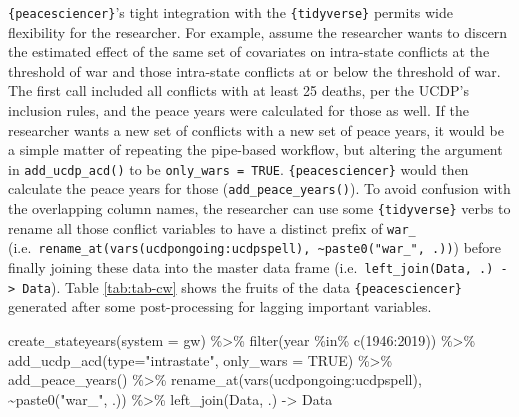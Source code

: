 \documentclass[
  11pt,
]{article}
\newenvironment{Shaded}{\begin{snugshade}}{\end{snugshade}}
\newcommand{\AttributeTok}[1]{\textcolor[rgb]{0.77,0.63,0.00}{#1}}
\newcommand{\ConstantTok}[1]{\textcolor[rgb]{0.00,0.00,0.00}{#1}}
\newcommand{\DecValTok}[1]{\textcolor[rgb]{0.00,0.00,0.81}{#1}}
\newcommand{\FunctionTok}[1]{\textcolor[rgb]{0.00,0.00,0.00}{#1}}
\newcommand{\NormalTok}[1]{#1}
\newcommand{\OtherTok}[1]{\textcolor[rgb]{0.56,0.35,0.01}{#1}}
\newcommand{\SpecialCharTok}[1]{\textcolor[rgb]{0.00,0.00,0.00}{#1}}
\newcommand{\StringTok}[1]{\textcolor[rgb]{0.31,0.60,0.02}{#1}}
\begin{document}
\texttt{\{peacesciencer\}}'s tight integration with the \texttt{\{tidyverse\}} permits wide flexibility for the researcher. For example, assume the researcher wants to discern the estimated effect of the same set of covariates on intra-state conflicts at the threshold of war and those intra-state conflicts at or below the threshold of war. The first call included all conflicts with at least 25 deaths, per the UCDP's inclusion rules, and the peace years were calculated for those as well. If the researcher wants a new set of conflicts with a new set of peace years, it would be a simple matter of repeating the pipe-based workflow, but altering the argument in \texttt{add\_ucdp\_acd()} to be \texttt{only\_wars\ =\ TRUE}. \texttt{\{peacesciencer\}} would then calculate the peace years for those (\texttt{add\_peace\_years()}). To avoid confusion with the overlapping column names, the researcher can use some \texttt{\{tidyverse\}} verbs to rename all those conflict variables to have a distinct prefix of \texttt{war\_} (i.e.~\texttt{rename\_at(vars(ucdpongoing:ucdpspell),\ \textasciitilde{}paste0("war\_",\ .))}) before finally joining these data into the master data frame (i.e.~\texttt{left\_join(Data,\ .)\ -\textgreater{}\ Data}). Table \ref{tab:tab-cw} shows the fruits of the data \texttt{\{peacesciencer\}} generated after some post-processing for lagging important variables.

\begin{Shaded}
\begin{Highlighting}[]
\FunctionTok{create\_stateyears}\NormalTok{(}\AttributeTok{system =} \StringTok{\textquotesingle{}gw\textquotesingle{}}\NormalTok{) }\SpecialCharTok{\%\textgreater{}\%}
  \FunctionTok{filter}\NormalTok{(year }\SpecialCharTok{\%in\%} \FunctionTok{c}\NormalTok{(}\DecValTok{1946}\SpecialCharTok{:}\DecValTok{2019}\NormalTok{)) }\SpecialCharTok{\%\textgreater{}\%}
  \FunctionTok{add\_ucdp\_acd}\NormalTok{(}\AttributeTok{type=}\StringTok{"intrastate"}\NormalTok{, }\AttributeTok{only\_wars =} \ConstantTok{TRUE}\NormalTok{) }\SpecialCharTok{\%\textgreater{}\%}
  \FunctionTok{add\_peace\_years}\NormalTok{() }\SpecialCharTok{\%\textgreater{}\%}
  \FunctionTok{rename\_at}\NormalTok{(}\FunctionTok{vars}\NormalTok{(ucdpongoing}\SpecialCharTok{:}\NormalTok{ucdpspell), }\SpecialCharTok{\textasciitilde{}}\FunctionTok{paste0}\NormalTok{(}\StringTok{"war\_"}\NormalTok{, .)) }\SpecialCharTok{\%\textgreater{}\%}
  \FunctionTok{left\_join}\NormalTok{(Data, .) }\OtherTok{{-}\textgreater{}}\NormalTok{ Data}
\end{Highlighting}
\end{Shaded}
\end{document}
